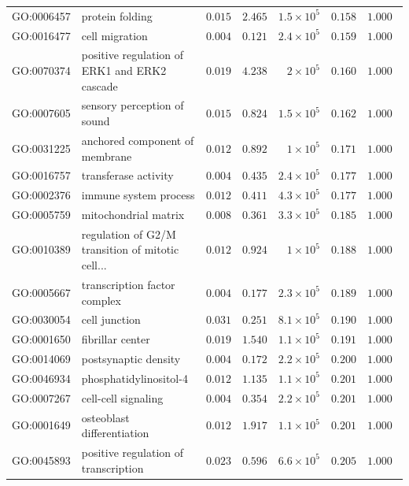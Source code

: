 \documentclass{article}
\begin{document}
\begin{center}
\begin{longtable*}{|l|l|r|r|r|r|r|}
            GO:0006457 & protein folding & $ 0.015$ & $ 2.465$ & $1.5\times 10^{5}$ & $ 0.158$ & $ 1.000~~$ \\
            GO:0016477 & cell migration & $ 0.004$ & $ 0.121$ & $2.4\times 10^{5}$ & $ 0.159$ & $ 1.000~~$ \\
            GO:0070374 & positive regulation of ERK1 and ERK2 cascade & $ 0.019$ & $ 4.238$ & $ 2\times 10^{5}$ & $ 0.160$ & $ 1.000~~$ \\
            GO:0007605 & sensory perception of sound & $ 0.015$ & $ 0.824$ & $1.5\times 10^{5}$ & $ 0.162$ & $ 1.000~~$ \\
            GO:0031225 & anchored component of membrane & $ 0.012$ & $ 0.892$ & $ 1\times 10^{5}$ & $ 0.171$ & $ 1.000~~$ \\
            GO:0016757 & transferase activity & $ 0.004$ & $ 0.435$ & $2.4\times 10^{5}$ & $ 0.177$ & $ 1.000~~$ \\
            GO:0002376 & immune system process & $ 0.012$ & $ 0.411$ & $4.3\times 10^{5}$ & $ 0.177$ & $ 1.000~~$ \\
            GO:0005759 & mitochondrial matrix & $ 0.008$ & $ 0.361$ & $3.3\times 10^{5}$ & $ 0.185$ & $ 1.000~~$ \\
            GO:0010389 & regulation of G2/M transition of mitotic cell... & $ 0.012$ & $ 0.924$ & $ 1\times 10^{5}$ & $ 0.188$ & $ 1.000~~$ \\
            GO:0005667 & transcription factor complex & $ 0.004$ & $ 0.177$ & $2.3\times 10^{5}$ & $ 0.189$ & $ 1.000~~$ \\
            GO:0030054 & cell junction & $ 0.031$ & $ 0.251$ & $8.1\times 10^{5}$ & $ 0.190$ & $ 1.000~~$ \\
            GO:0001650 & fibrillar center & $ 0.019$ & $ 1.540$ & $1.1\times 10^{5}$ & $ 0.191$ & $ 1.000~~$ \\
            GO:0014069 & postsynaptic density & $ 0.004$ & $ 0.172$ & $2.2\times 10^{5}$ & $ 0.200$ & $ 1.000~~$ \\
            GO:0046934 & phosphatidylinositol-4 & $ 0.012$ & $ 1.135$ & $1.1\times 10^{5}$ & $ 0.201$ & $ 1.000~~$ \\
            GO:0007267 & cell-cell signaling & $ 0.004$ & $ 0.354$ & $2.2\times 10^{5}$ & $ 0.201$ & $ 1.000~~$ \\
            GO:0001649 & osteoblast differentiation & $ 0.012$ & $ 1.917$ & $1.1\times 10^{5}$ & $ 0.201$ & $ 1.000~~$ \\
            GO:0045893 & positive regulation of transcription & $ 0.023$ & $ 0.596$ & $6.6\times 10^{5}$ & $ 0.205$ & $ 1.000~~$ \\

\end{longtable*}
\end{center}
\end{document}
